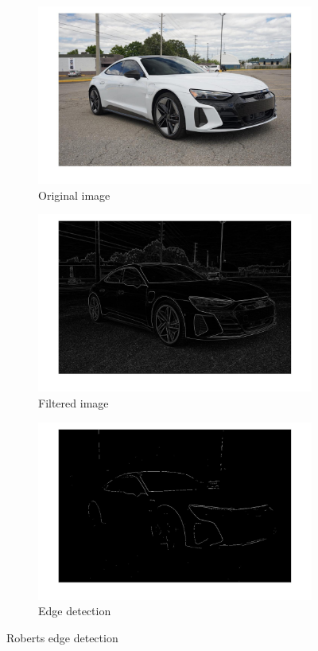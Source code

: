 \documentclass[conference]{IEEEtran}
\begin{document}
\begin{figure}[h!]
\centering
\begin{subfigure}[b]{0.3\linewidth}
\includegraphics[width=\linewidth]{images/original.jpg}
\caption{Original image}
\end{subfigure}
\begin{subfigure}[b]{0.3\linewidth}
\includegraphics[width=\linewidth]{images/img1.jpg}
\caption{Filtered image}
\end{subfigure}
\begin{subfigure}[b]{0.3\linewidth}
\includegraphics[width=\linewidth]{images/img2.jpg}
\caption{Edge detection}
\end{subfigure}
\caption{Roberts edge detection}
\label{fig:robert edge}
\end{figure}
\end{document}
